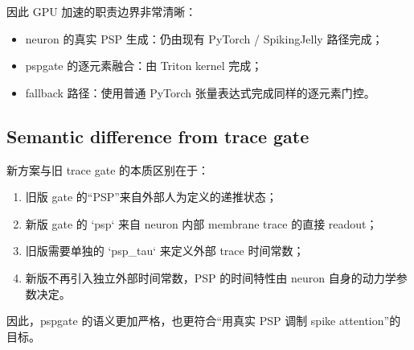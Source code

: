 因此 GPU 加速的职责边界非常清晰：
\begin{itemize}
  \item neuron 的真实 PSP 生成：仍由现有 PyTorch / SpikingJelly 路径完成；
  \item pspgate 的逐元素融合：由 Triton kernel 完成；
  \item fallback 路径：使用普通 PyTorch 张量表达式完成同样的逐元素门控。
\end{itemize}

\subsection{Semantic difference from trace gate}
新方案与旧 trace gate 的本质区别在于：
\begin{enumerate}
  \item 旧版 gate 的“PSP”来自外部人为定义的递推状态；
  \item 新版 gate 的 `psp` 来自 neuron 内部 membrane trace 的直接 readout；
  \item 旧版需要单独的 `psp\_tau` 来定义外部 trace 时间常数；
  \item 新版不再引入独立外部时间常数，PSP 的时间特性由 neuron 自身的动力学参数决定。
\end{enumerate}

因此，pspgate 的语义更加严格，也更符合“用真实 PSP 调制 spike attention”的目标。
